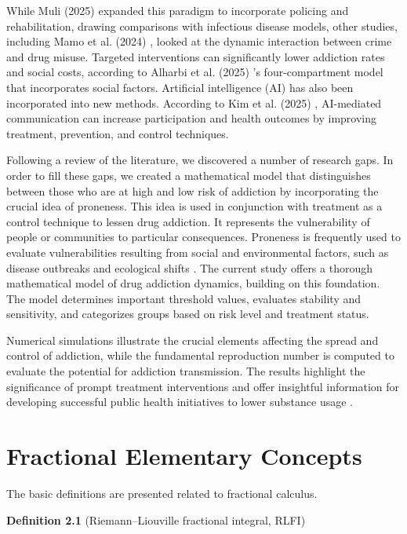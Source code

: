 \documentclass[10pt]{NSP1}
\begin{document}
	While Muli (2025) \cite{ref19} expanded this paradigm to incorporate policing and rehabilitation, drawing comparisons with infectious disease models, other studies, including Mamo et al. (2024) \cite{ref18}, looked at the dynamic interaction between crime and drug misuse. Targeted interventions can significantly lower addiction rates and social costs, according to Alharbi et al. (2025) \cite{ref20}'s four-compartment model that incorporates social factors. Artificial intelligence (AI) has also been incorporated into new methods. According to Kim et al. (2025) \cite{ref21}, AI-mediated communication can increase participation and health outcomes by improving treatment, prevention, and control techniques.
	
	Following a review of the literature, we discovered a number of research gaps. In order to fill these gaps, we created a mathematical model that distinguishes between those who are at high and low risk of addiction by incorporating the crucial idea of proneness. This idea is used in conjunction with treatment as a control technique to lessen drug addiction. It represents the vulnerability of people or communities to particular consequences. Proneness is frequently used to evaluate vulnerabilities resulting from social and environmental factors, such as disease outbreaks and ecological shifts \cite{ref20,ref21,ref22,ref23,ref24,ref25}. The current study offers a thorough mathematical model of drug addiction dynamics, building on this foundation. The model determines important threshold values, evaluates stability and sensitivity, and categorizes groups based on risk level and treatment status.
	
	Numerical simulations illustrate the crucial elements affecting the spread and control of addiction, while the fundamental reproduction number is computed to evaluate the potential for addiction transmission. The results highlight the significance of prompt treatment interventions and offer insightful information for developing successful public health initiatives to lower substance usage \cite{ref15,ref16,ref17,ref18,ref19,ref20}.
	
	\section{Fractional Elementary Concepts}
	
	The basic definitions are presented related to fractional calculus.
	
	\textbf{Definition 2.1} (Riemann–Liouville fractional integral, RLFI)  
	
\end{document}

